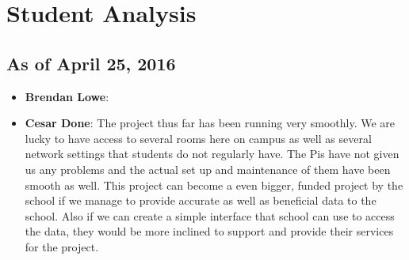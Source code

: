 \documentclass{article}
\begin{document}
		
	\newpage
	\section{Student Analysis}\label{sec:analysis}
		\subsection{As of April 25, 2016}
			\begin{itemize}
				\item {\bfseries Brendan Lowe}:
				\item {\bfseries Cesar Done}: The project thus far has been running very smoothly. We are lucky to have access to several rooms here on campus as well 
								  as several network settings that students do not regularly have. The Pis have not given us any problems and the actual set 
								  up and maintenance of them have been smooth as well. This project can  become a even bigger, funded project by the school
								   if we manage to provide accurate as well as beneficial data to the school. Also if we can create a simple interface that 
								   school can use to access the data, they would be more inclined to support and provide their services for the project. 
							

\end{itemize}
\end{document}
